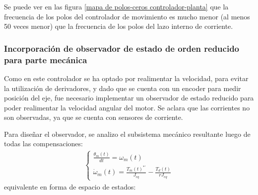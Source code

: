 \documentclass[a4paper, 10pt, onecolumn,journal]{ieeeconf}
\begin{document}
Se puede ver en las figura \cref{mapa de polos-ceros controlador-planta} que la frecuencia de los polos del controlador de movimiento
es mucho menor (al menos 50 veces menor) que la frecuencia de los polos del lazo interno de corriente.

\subsubsection{\textbf{Incorporación de observador de estado de orden reducido para parte mecánica}}
Como en este controlador se ha optado por realimentar la velocidad, para evitar la utilización de derivadores, y dado que se cuenta con un encoder para medir posición del eje, fue necesario implementar un observador de estado reducido para poder realimentar la velocidad angular del motor. Se aclara que las corrientes no son observadas, ya que se cuenta con sensores de corriente.

Para diseñar el observador, se analizo el subsistema mecánico resultante luego de todas las compensaciones:
\begin{align}
	\begin{cases}
		\frac{\theta_m(t)}{dt} ={\omega}_m(t)\\
		\dot{\omega}_m(t) = \frac{{T_m(t)}^{*'}}{ J_{eq}}- \frac{T_d(t)}{r J_{eq}}
	\end{cases}\label{ecuacion de subsistema mecanico compensado}
\end{align}
 equivalente en forma de espacio de estados:
 
\end{document}

